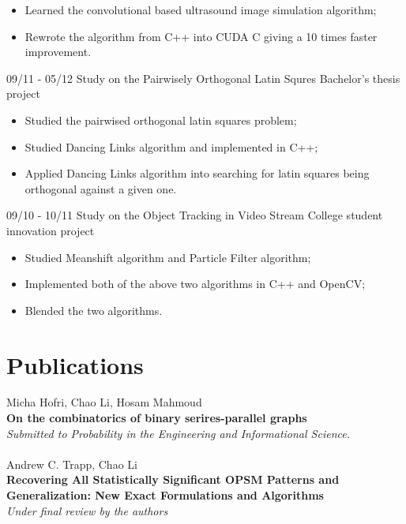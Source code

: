 \documentclass[]{friggeri-cv}
\begin{document}
\begin{entrylist}
{		\begin{itemize}
			\item Learned the convolutional based ultrasound image simulation
				algorithm;
			\item Rewrote the algorithm from C++ into CUDA C giving a 10 times faster
				improvement.
		\end{itemize}
	}
	\entry
	{09/11 - 05/12}
	{Study on the Pairwisely Orthogonal Latin Squres}
	{Bachelor's thesis project}
	{
		\vspace{-3mm}
		\begin{itemize}
			\item Studied the pairwised orthogonal latin squares problem;
			\item Studied Dancing Links algorithm and implemented in C++;
			\item Applied Dancing Links algorithm into searching for latin squares
				being orthogonal against a given one.	\\
		\end{itemize}
	}
	\entry
	{09/10 - 10/11}
	{Study on the Object Tracking in Video Stream}
	{College student innovation project}
	{
		\vspace{-3mm}
		\begin{itemize}
			\item Studied Meanshift algorithm and Particle Filter algorithm;
			\item Implemented both of the above two algorithms in C++ and OpenCV;
			\item Blended the two algorithms.
		\end{itemize}
	}
\end{entrylist}

\section{Publications}
Micha Hofri, Chao Li, Hosam Mahmoud\\
\textbf{On the combinatorics of binary serires-parallel graphs}\\
\emph{Submitted to Probability in the Engineering and Informational Science.}
\\
\\
Andrew C. Trapp, Chao Li\\
\textbf{Recovering All Statistically Significant OPSM Patterns and
Generalization: New Exact Formulations and Algorithms}\\
\emph{Under final review by the authors}
\end{document}
